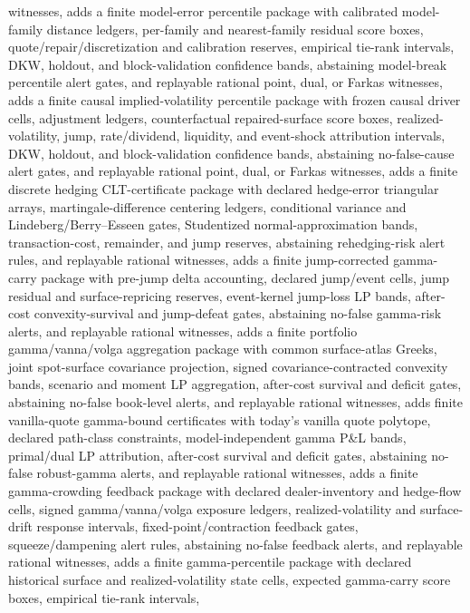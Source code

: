 \documentclass[11pt]{article}
\begin{document}
witnesses, adds a finite model-error percentile package with calibrated model-family distance
ledgers, per-family and nearest-family residual score boxes, quote/repair/discretization and
calibration reserves, empirical tie-rank intervals, DKW, holdout, and block-validation confidence
bands, abstaining model-break percentile alert gates, and replayable rational point, dual, or
Farkas witnesses, adds a finite causal implied-volatility percentile package with frozen causal
driver cells, adjustment ledgers, counterfactual repaired-surface score boxes, realized-volatility,
jump, rate/dividend, liquidity, and event-shock attribution intervals, DKW, holdout, and
block-validation confidence bands, abstaining no-false-cause alert gates, and replayable rational
point, dual, or Farkas witnesses, adds a finite discrete hedging CLT-certificate package with
declared hedge-error triangular arrays, martingale-difference centering ledgers, conditional
variance and Lindeberg/Berry--Esseen gates, Studentized normal-approximation bands,
transaction-cost, remainder, and jump reserves, abstaining rehedging-risk alert rules, and
replayable rational witnesses, adds a finite jump-corrected gamma-carry package with pre-jump
delta accounting, declared jump/event cells, jump residual and surface-repricing reserves,
event-kernel jump-loss LP bands, after-cost convexity-survival and jump-defeat gates, abstaining
no-false gamma-risk alerts, and replayable rational witnesses, adds a finite portfolio
gamma/vanna/volga aggregation package with common surface-atlas Greeks, joint spot-surface
covariance projection, signed covariance-contracted convexity bands, scenario and moment LP
aggregation, after-cost survival and deficit gates, abstaining no-false book-level alerts, and
replayable rational witnesses, adds finite vanilla-quote gamma-bound certificates with today's
vanilla quote polytope, declared path-class constraints, model-independent gamma P\&L bands,
primal/dual LP attribution, after-cost survival and deficit gates, abstaining no-false robust-gamma
alerts, and replayable rational witnesses, adds a finite gamma-crowding feedback package with
declared dealer-inventory and hedge-flow cells, signed gamma/vanna/volga exposure ledgers,
realized-volatility and surface-drift response intervals, fixed-point/contraction feedback gates,
squeeze/dampening alert rules, abstaining no-false feedback alerts, and replayable rational
witnesses, adds a finite gamma-percentile package with declared historical surface and
realized-volatility state cells, expected gamma-carry score boxes, empirical tie-rank intervals,
\end{document}

